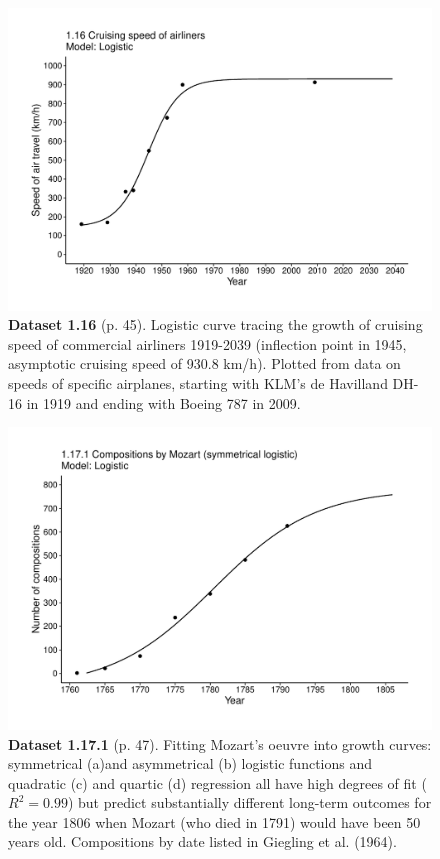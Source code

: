 \documentclass[aps,rmp,preprint,superscriptaddress,10pt,onecolumn]{article}
\begin{document}
\clearpage
\begin{figure}[h]
\includegraphics[width=\textwidth]{output/figs-ggplot/1.16.pdf}
\caption*{\textbf{Dataset 1.16} (p. 45). Logistic curve tracing the growth of cruising speed of commercial airliners 1919-2039 (inflection point in 1945, asymptotic cruising speed of 930.8 km/h). Plotted from data on speeds of specific airplanes, starting with KLM's de Havilland DH-16 in 1919 and ending with Boeing 787 in 2009. }
\end{figure}
	
\clearpage
\begin{figure}[h]
\includegraphics[width=\textwidth]{output/figs-ggplot/1.17.1.pdf}
\caption*{\textbf{Dataset 1.17.1} (p. 47). Fitting Mozart's oeuvre into growth curves: symmetrical (a)and asymmetrical (b) logistic functions and quadratic (c) and quartic (d) regression all have high degrees of fit ($R^2=0.99$) but predict substantially different long-term outcomes for the year 1806 when Mozart (who died in 1791) would have been 50 years old. Compositions by date listed in Giegling et al. (1964).}
\end{figure}
	
\end{document}
